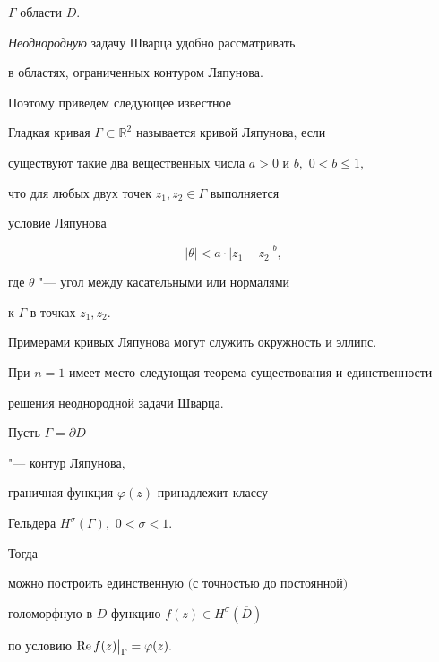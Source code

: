 $\Gamma$ области $D.$

{\it Неоднородную } задачу Шварца удобно рассматривать \cite{2Nk-Nk2}

в областях, ограниченных контуром Ляпунова.

Поэтому приведем следующее известное



\smallskip

\begin{definition}

 Гладкая кривая $\Gamma\subset\mathbb{R}^2$ называется кривой Ляпунова, если

    существуют  такие два вещественных числа $a>0$ и $b,$ $0<b\le 1,$

   что для любых двух точек $z_1,z_2\in \Gamma$   выполняется

    условие Ляпунова

    $$

    |\theta|<a\cdot|z_1-z_2|^b,

      $$

     где $\theta$  "--- угол между касательными или нормалями

      к $\Gamma$ в  точках $z_1, z_2.$

      \end{definition}

      

\smallskip



Примерами  кривых Ляпунова могут служить окружность и эллипс.



При  $n=1$  имеет место следующая теорема существования и единственности

решения неоднородной задачи Шварца.



\smallskip



\hypertarget{nik:th1}{}



 \begin{theorem}Пусть $\Gamma=\partial D$ 

 "--- контур Ля\-пу\-но\-ва$,$

  граничная функция $\varphi(z)$ принадлежит  классу

Гельдера $H^\sigma(\Gamma),$ \mbox{$0<\sigma<1.$}

 Тогда

  можно построить единственную $($с точностью до постоянной$)$

 голоморфную в $D$ функцию $f(z)\in H^\sigma(\overline{D})$

  по  условию ${\rm Re}\,f(z)\bigr|_\Gamma=\varphi(z).$

\end{theorem}



